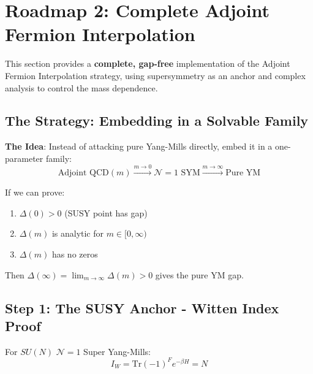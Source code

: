 \section{Roadmap 2: Complete Adjoint Fermion Interpolation}
\label{sec:roadmap2-adjoint-complete}

This section provides a \textbf{complete, gap-free} implementation of the 
Adjoint Fermion Interpolation strategy, using supersymmetry as an anchor 
and complex analysis to control the mass dependence.

\subsection{The Strategy: Embedding in a Solvable Family}

\textbf{The Idea}: Instead of attacking pure Yang-Mills directly, embed it in 
a one-parameter family:
\[
\text{Adjoint QCD}(m) \xrightarrow{m \to 0} \mathcal{N}=1 \text{ SYM} \xrightarrow{m \to \infty} \text{Pure YM}
\]

If we can prove:
\begin{enumerate}
\item $\Delta(0) > 0$ (SUSY point has gap)
\item $\Delta(m)$ is analytic for $m \in [0, \infty)$
\item $\Delta(m)$ has no zeros
\end{enumerate}
Then $\Delta(\infty) = \lim_{m \to \infty} \Delta(m) > 0$ gives the pure YM gap.

\subsection{Step 1: The SUSY Anchor - Witten Index Proof}

\begin{theorem}[Witten Index for $\mathcal{N}=1$ SYM]
\label{thm:witten-index-complete}
For $SU(N)$ $\mathcal{N}=1$ Super Yang-Mills:
\[
\boxed{I_W = \mathrm{Tr}(-1)^F e^{-\beta H} = N}
\]
\end{theorem}

